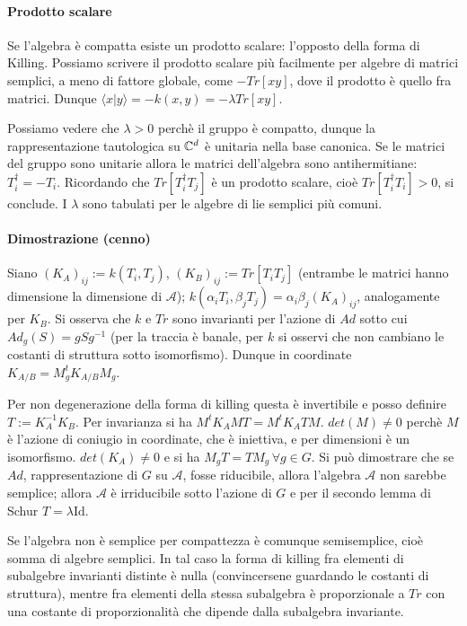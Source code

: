 \documentclass[12pt,oneside,notitlepage,abstracton,a4paper]{scrartcl}
\newcommand{\A}{\mathcal{A}}
\begin{document}
\paragraph{Prodotto scalare} Se l'algebra è compatta esiste un prodotto scalare: l'opposto della forma di Killing. Possiamo scrivere il prodotto scalare più facilmente per algebre di matrici semplici, a meno di fattore globale, come $-Tr[xy]$, dove il prodotto è quello fra matrici. Dunque $\langle x|y \rangle = -k(x,y) = -\lambda Tr[xy]$.

Possiamo vedere che $\lambda>0$ perchè il gruppo è compatto, dunque la rappresentazione tautologica su $\mathbb{C}^d$ è unitaria nella base canonica. Se le matrici del gruppo sono unitarie allora le matrici dell'algebra sono antihermitiane: $T_i^\dagger = -T_i$. Ricordando che $Tr[T_i^\dagger T_j]$ è un prodotto scalare, cioè $Tr[T_i^\dagger T_i]>0$, si conclude. I $\lambda$ sono tabulati per le algebre di lie semplici più comuni.

\paragraph{Dimostrazione (cenno)} Siano $(K_A)_{ij} := k(T_i, T_j)$, $(K_B)_{ij} := Tr[T_iT_j]$ (entrambe le matrici hanno dimensione la dimensione di $\A$); $k(\alpha_i T_i, \beta_j T_j) = \alpha_i \beta_j (K_A)_{ij}$, analogamente per $K_B$. Si osserva che $k$ e $Tr$ sono invarianti per l'azione di $Ad$ sotto cui $Ad_g(S) = gSg^{-1}$ (per la traccia è banale, per $k$ si osservi che non cambiano le costanti di struttura sotto isomorfismo). Dunque in coordinate $K_{A/B} = M_g^t K_{A/B} M_g$.

Per non degenerazione della forma di killing questa è invertibile e posso definire $T := K_A^{-1} K_B$. Per invarianza si ha $M^t K_A MT = M^t K_A TM$. $det(M)\neq 0$ perchè $M$ è l'azione di coniugio in coordinate, che è iniettiva, e per dimensioni è un isomorfismo. $det(K_A)\neq 0$ e si ha $M_g T = T M_g\,\forall g\in G$. Si può dimostrare che se $Ad$, rappresentazione di $G$ su $\A$, fosse riducibile, allora l'algebra $\A$ non sarebbe semplice; allora $\A$ è irriducibile sotto l'azione di $G$ e per il secondo lemma di Schur $T = \lambda \mathrm{Id}$.

Se l'algebra non è semplice per compattezza è comunque semisemplice, cioè somma di algebre semplici. In tal caso la forma di killing fra elementi di subalgebre invarianti distinte è nulla (convincersene guardando le costanti di struttura), mentre fra elementi della stessa subalgebra è proporzionale a $Tr$ con una costante di proporzionalità che dipende dalla subalgebra invariante.
\end{document}
